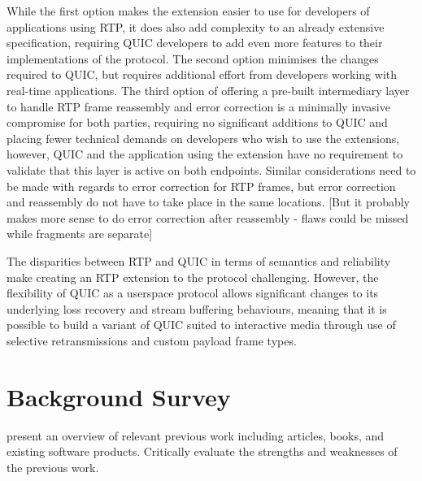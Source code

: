 \documentclass{mprop}
\begin{document}

While the first option makes the extension easier to use for developers of applications using RTP, it does also add complexity to an already extensive specification, requiring QUIC developers to add even more features to their implementations of the protocol. The second option minimises the changes required to QUIC, but requires additional effort from developers working with real-time applications. The third option of offering a pre-built intermediary layer to handle RTP frame reassembly and error correction is a minimally invasive compromise for both parties, requiring no significant additions to QUIC and placing fewer technical demands on developers who wish to use the extensions, however, QUIC and the application using the extension have no requirement to validate that this layer is active on both endpoints. Similar considerations need to be made with regards to error correction for RTP frames, but error correction and reassembly do not have to take place in the same locations. [But it probably makes more sense to do error correction after reassembly - flaws could be missed while fragments are separate]

The disparities between RTP and QUIC in terms of semantics and reliability make creating an RTP extension to the protocol challenging. However, the flexibility of QUIC as a userspace protocol allows significant changes to its underlying loss recovery and stream buffering behaviours, meaning that it is possible to build a variant of QUIC suited to interactive media through use of selective retransmissions and custom payload frame types. 



\newpage

\section{Background Survey}

present an overview of relevant previous work including articles, books, and existing software products. Critically evaluate the strengths and weaknesses of the previous work.
\end{document}
